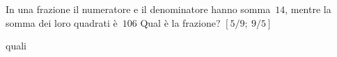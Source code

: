 \begin{multicols}{2}
\begin{esercizio}[\Ast]
 \label{ese:3.127}
In una frazione il numeratore e il denominatore hanno somma~\(14\), mentre 
la
somma dei loro quadrati è~\(106\) Qual è la frazione?
\hfill\(\left[5/9;~9/5\right]\)
\end{esercizio}
% 
% 
% 
% 
quali 
% 

\end{multicols}
